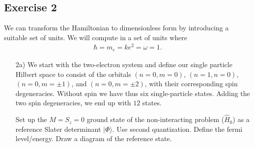 \documentclass[a4paper]{article}
\begin{document}
\newpage
\subsection*{Exercise 2}
We can transform the Hamiltonian to dimensionless form by introducing a suitable set of units. We will compute in a set of units where
\begin{align}
\hbar=m_e=ke^2=\omega=1.
\end{align}
\begin{exframe}
\begin{itemize}
  \item[2a)] We start with the two-electron system and define our single particle Hilbert space to consist of the orbitals $(n=0,m=0)$, $(n=1,n=0)$, $(n=0, m=\pm1)$, and $(n=0, m=\pm2)$, with their corresponding spin degeneracies. Without spin we have thus six single-particle states. Adding the two spin degeneracies, we end up with $12$ states.

  Set up the $M=S_z=0$ ground state of the non-interacting problem ($\hat{H}_0$) as a reference Slater determinant $|\Phi\rangle$. Use second quantization. Define the fermi level/energy. Draw a diagram of the reference state.
\end{itemize}
\end{exframe}
\end{document}
